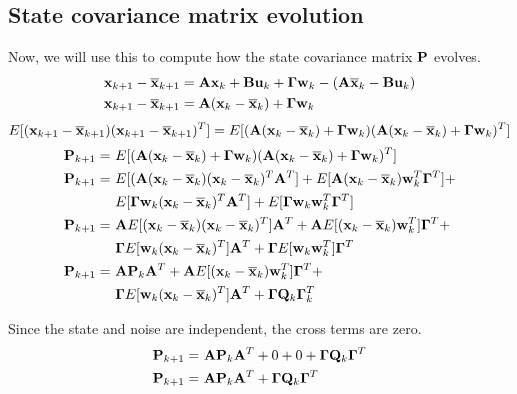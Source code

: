 \subsection{State covariance matrix evolution}

Now, we will use this to compute how the \gls{state} covariance matrix $\mathbf{P}$
evolves.
\begin{align*}
  \mathbf{x}_{k+1} - \overline{\mathbf{x}}_{k+1} &= \mathbf{A}\mathbf{x}_k +
    \mathbf{B}\mathbf{u}_k + \mathbf{\Gamma}\mathbf{w}_k - (\mathbf{A}\overline{\mathbf{x}}_k -
    \mathbf{B}\mathbf{u}_k) \\
  \mathbf{x}_{k+1} - \overline{\mathbf{x}}_{k+1} &=
    \mathbf{A}(\mathbf{x}_k - \overline{\mathbf{x}}_k) + \mathbf{\Gamma}\mathbf{w}_k
\end{align*}
\begin{equation*}
  E[(\mathbf{x}_{k+1} - \overline{\mathbf{x}}_{k+1})(\mathbf{x}_{k+1} - \overline{\mathbf{x}}_{k+1})^T] =
    E[(\mathbf{A}(\mathbf{x}_k - \overline{\mathbf{x}}_k) + \mathbf{\Gamma}\mathbf{w}_k)
      (\mathbf{A}(\mathbf{x}_k - \overline{\mathbf{x}}_k) + \mathbf{\Gamma}\mathbf{w}_k)^T]
\end{equation*}
\begin{align*}
  \mathbf{P}_{k+1} =~&
    E[(\mathbf{A}(\mathbf{x}_k - \overline{\mathbf{x}}_k) + \mathbf{\Gamma}\mathbf{w}_k)
      (\mathbf{A}(\mathbf{x}_k - \overline{\mathbf{x}}_k) + \mathbf{\Gamma}\mathbf{w}_k)^T] \\
  \mathbf{P}_{k+1} =~&
    E[(\mathbf{A}(\mathbf{x}_k - \overline{\mathbf{x}}_k)(\mathbf{x}_k - \overline{\mathbf{x}}_k)^T
      \mathbf{A}^T] +
    E[\mathbf{A}(\mathbf{x}_k - \overline{\mathbf{x}}_k)\mathbf{w}_k^T\mathbf{\Gamma}^T] + \\
    &E[\mathbf{\Gamma}\mathbf{w}_k(\mathbf{x}_k - \overline{\mathbf{x}}_k)^T\mathbf{A}^T] +
    E[\mathbf{\Gamma}\mathbf{w}_k\mathbf{w}_k^T\mathbf{\Gamma}^T] \\
  \mathbf{P}_{k+1} =~&
    \mathbf{A}E[(\mathbf{x}_k - \overline{\mathbf{x}}_k)(\mathbf{x}_k - \overline{\mathbf{x}}_k)^T]
    \mathbf{A}^T +
    \mathbf{A}E[(\mathbf{x}_k - \overline{\mathbf{x}}_k)\mathbf{w}_k^T]\mathbf{\Gamma}^T + \\
    &\mathbf{\Gamma} E[\mathbf{w}_k(\mathbf{x}_k - \overline{\mathbf{x}}_k)^T]\mathbf{A}^T +
    \mathbf{\Gamma} E[\mathbf{w}_k\mathbf{w}_k^T]\mathbf{\Gamma}^T \\
  \mathbf{P}_{k+1} =~& \mathbf{A}\mathbf{P}_k\mathbf{A}^T +
    \mathbf{A}E[(\mathbf{x}_k - \overline{\mathbf{x}}_k)\mathbf{w}_k^T]\mathbf{\Gamma}^T + \\
    &\mathbf{\Gamma} E[\mathbf{w}_k(\mathbf{x}_k - \overline{\mathbf{x}}_k)^T]\mathbf{A}^T +
    \mathbf{\Gamma}\mathbf{Q}_k\mathbf{\Gamma}_k^T
\end{align*}

Since the state and noise are independent, the cross terms are zero.
\begin{align*}
  \mathbf{P}_{k+1} =~& \mathbf{A}\mathbf{P}_k\mathbf{A}^T + 0 + 0 +
    \mathbf{\Gamma}\mathbf{Q}_k\mathbf{\Gamma}^T \\
  \mathbf{P}_{k+1} =~& \mathbf{A}\mathbf{P}_k\mathbf{A}^T +
    \mathbf{\Gamma}\mathbf{Q}_k\mathbf{\Gamma}^T
\end{align*}


